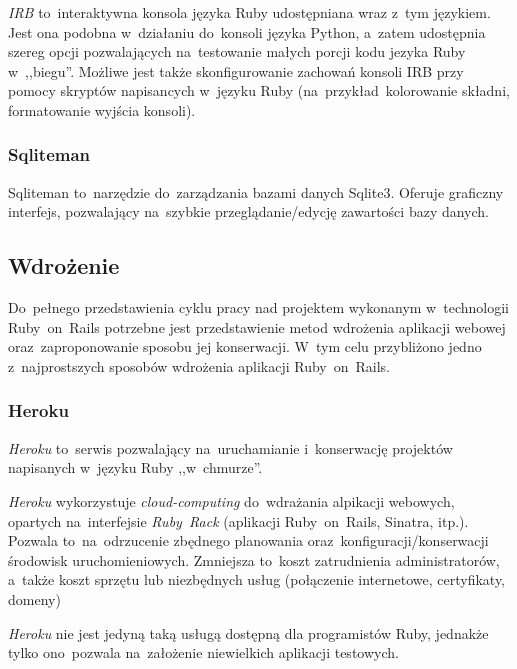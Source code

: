 \textit{IRB} to~interaktywna konsola języka Ruby udostępniana wraz z~tym językiem. Jest ona podobna w~działaniu do~konsoli języka Python, a~zatem udostępnia szereg opcji pozwalających na~testowanie małych porcji kodu jezyka Ruby w~,,biegu''. Możliwe jest także skonfigurowanie zachowań konsoli IRB przy pomocy skryptów napisancych w~języku Ruby (na~przykład~kolorowanie składni, formatowanie wyjścia konsoli).

\subsubsection{Sqliteman}

Sqliteman\cite{sqliteman} to~narzędzie do~zarządzania bazami danych Sqlite3. Oferuje graficzny interfejs, pozwalający na~szybkie przeglądanie/edycję zawartości bazy danych.

\subsection{Wdrożenie}

Do~pełnego przedstawienia cyklu pracy nad projektem wykonanym w~technologii Ruby~on~Rails potrzebne jest przedstawienie metod wdrożenia aplikacji webowej oraz~zaproponowanie sposobu jej konserwacji. W~tym celu przybliżono jedno z~najprostszych sposobów wdrożenia aplikacji Ruby~on~Rails.

\subsubsection{Heroku}

\textit{Heroku}\cite{heroku} to~serwis pozwalający na~uruchamianie i~konserwację projektów napisanych w~języku Ruby ,,w~chmurze''.


\textit{Heroku} wykorzystuje \textit{cloud-computing} do~wdrażania alpikacji webowych, opartych na~interfejsie \textit{Ruby~Rack} (aplikacji Ruby~on~Rails, Sinatra, itp.). Pozwala to~na~odrzucenie zbędnego planowania oraz~konfiguracji/konserwacji środowisk uruchomieniowych. Zmniejsza to~koszt zatrudnienia administratorów, a~także koszt sprzętu lub niezbędnych usług (połączenie internetowe, certyfikaty, domeny)


\textit{Heroku} nie jest jedyną taką usługą dostępną dla programistów Ruby, jednakże tylko ono~pozwala na~założenie niewielkich aplikacji testowych.
